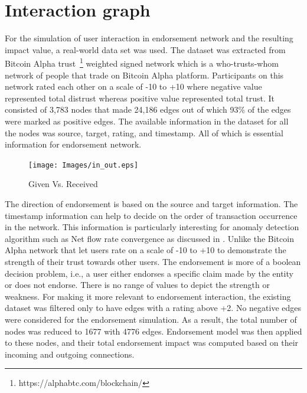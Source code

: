 \section{Interaction graph} \label{sec:interaction}
For the simulation of user interaction in endorsement network and the resulting
impact value, a real-world data set was used. The dataset was extracted from
Bitcoin Alpha trust~\footnote{https://alphabtc.com/blockchain/} weighted signed
network which is a who-trusts-whom network of people that trade on Bitcoin
Alpha platform. Participants on this network rated each other on a scale of -10
to +10 where negative value represented total distrust whereas positive value
represented total trust. It consisted of 3,783 nodes that made 24,186 edges out
of which 93\% of the edges were marked as positive edges\cite{kumar2016edge}.
The available information in the dataset for all the nodes was source, target,
rating, and timestamp. All of which is essential information for endorsement
network.
\begin{figure}
	\texttt{[image: Images/in\_out.eps]} 
	\caption{Given Vs. Received} 
	\label{inOut}
\end{figure}
The direction of endorsement is based on the source and target information.
The timestamp information can help to decide on the order of transaction
occurrence in the network. This information is particularly interesting for
anomaly detection algorithm such as Net flow rate convergence as discussed in
\cite{buechler2015decentralized}. Unlike the Bitcoin Alpha network that let
users rate on a scale of -10 to +10 to demonstrate the strength of their trust
towards other users. The endorsement is more of a boolean decision problem,
i.e., a user either endorses a specific claim made by the entity or does not
endorse. There is no range of values to depict the strength or weakness. For
making it more relevant to endorsement interaction, the existing dataset was
filtered only to have edges with a rating above +2. No negative edges were
considered for the endorsement simulation. As a result, the total number of
nodes was reduced to 1677 with 4776 edges. Endorsement model was then applied
to these nodes, and their total endorsement impact was computed based on their
incoming and outgoing connections. 

